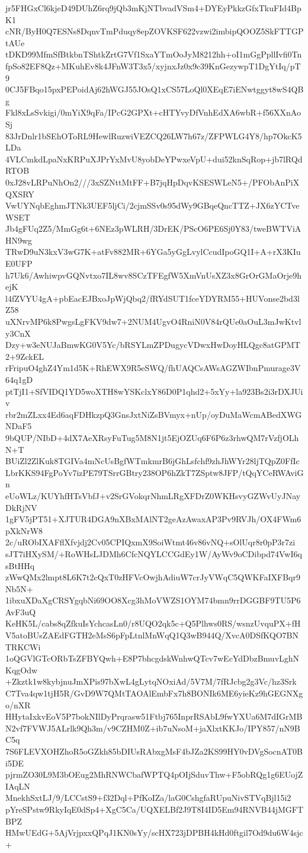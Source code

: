 jr5FHGxCl6kjeD49DUhZ6rq9jQb3mKjNTbvadVSm4+DYEyPkkzGfxTkuFId4BpK1
cNR/ByH0Q7ESNs8DqnvTmPduqy8epZOVKSF622vzwi2imbipQOOZ5SkFTTGPtAUe
tDKD99MfmSfBtkbnTShtkZrtG7Vf1SxaYTmOoJyM8212hh+oI1mGgPpllIvfi0Tn
fpSo82EF8Qz+MKuhEv8k4JFnW3T3x5/xyjnxJz0x9c39KnGezywpT1DgYtIq/pT9
0CJ5FBqo15pxPEPoidAj62hWGJ55JOsQ1xCS57LoQl0XEqE7iENwtggyt8wS4QBg
Fkl8xLsSvkigi/0mYiX9qFa/IPcG2GPXt+cHTYvyDfVnhEdXA6wbR+f56XXnAoSj
83JrDnlr1bSEhOToRL9HewlRuzwiVEZCQ26LW7h67z/ZFPWLG4Y8/hp7OkcK5LDa
4VLCmkdLpaNxKRPuXJPrYxMvU8yobDeYPwxeVpU+dui52knSqRop+jb7lRQdRTOB
0xJ28vLRPuNhOn2///3xSZNttMtFF+B7jqHpDqvKSESWLeN5+/PFObAnPiXQXSRY
VwUYNqbEghmJTNk3UEF5ljCi/2cjmSSv0s95dWy9GBqeQncTTZ+JX6zYCTveWSET
Jb4gFUq2Z5/MmGg6t+6NEz3pWLRH/3DrEK/PScO6PE6Sj0Y83/tweBWTViAHN9wg
TRwD9uN3kxV3wG7K+atFv882MR+6YGa5yGgLvylCcudIpoGQ1I+A+rX3KIuE0UFP
h7Uk6/AwhiwpvGQNvtxo7IL8wv8SCzTFEgfW5XmVnUsXZ3x8GrOrGMaOrje9hejK
l4fZVYU4gA+pbEacEJBxoJpWjQbq2/fRYdSUT1fceYDYRM55+HUVonse2bd3lZ58
uXNrvMP6k8PwgsLgFKV9dw7+2NUM4UgvO4RniN0V84rQUe0aOuL3mJwKtvly3CnX
Dzy+w3eNUJaBmwKG0V5Yc/bRSYLmZPDugycVDwxHwDoyHLQgc8atGPMT2+9ZckEL
rFripuO4ghZ4Ym1d5K+RhEWX9R5eSWQ/fhUAQCsAWsAGZWIbnPmurage3V64q1gD
ptTjI1+SfVIDQ1YD5woXTH8wYSKclxY86D0P1qhd2+5xYy+la923Bs2i3rDXJUiv
rbr2mZLxx4Ed6aqFDHkzpQ3GnsJxtNiZsBVmyx+nUp/oyDuMaWcmABedXWGNDaF5
9bQUP/NIbD+4dX7AeXRsyFuTug5M8N1jt5EjOZUq6F6P6z3rhwQM7rVzfjOLhN+T
BUiZl2ZlKuk8TGIVa4mNcUsBgfWTmkmrB6jGhLsfchf9zhJhWYr28ljTQpZ0FfIc
LbrKKS94FgPoYv7izPE79TSrrGBtry238OP6hZkT7ZSptw8JFP/tQqYCeRWAviGn
eUoWLz/KUYhfHTsVbfJ+v2SrGVokqrNhmLRgXFDrZ0WKHsvyGZWvUyJNayDkRjNV
1gFV5jPT51+XJTUR4DGA9nXBxMAlNT2geAzAwaxAP3Pv9RVJh/OX4FWm6pXkNrW8
2c/uRObIXAFflXfvjdj2Cv05CPIQxmX9SoiWtmt46v86vNQ+sOlUqr8r0pP3r7zi
sJT7iHXySM/+RoWHsLJDMh6CfcNQYLCCGdEy1W/AyWv9oCDibpd74VwI6qsBtHHq
zWwQMx2lmpt8L6K7t2cQxT0zHFVcOwjhAdiuW7crJyVWqC5QWKFaIXFBqr9Nb5N+
1ibxuXDaXgCRSYgqbNi69OO8Xcg3hMoVWZS1OYM74bmn9rrDGGBF9TU5P6AvF3uQ
KeHK5L/cabs8qZfkuIsYchcasLn0/r8UQO2qk5c+Q5Plhws0RS/wsnzUvquPX+fH
V5atoBUsZAEdFGTH2eMsS6pFpLtnlMnWqQ1Q3wB944Q/XvcA0DSfKQO7BNTRKCWi
1oQGVlGTcORbTsZFBYQwh+E8P7bhcgdskWnhwQTcv7wEcYdDbzBmuvLghNKqgOdw
+Zkztk1w8kybjnuJmXPis97bXwL4gLytqNOxiAd/5V7M/7fRJcbg2g3Vc/hz3Srk
C7Tva4qw1tjH5R/GvD9W7QMtTAOAlEmbFx7h8BONIk6ME6yieKz9hGEGNXgo/nXR
HHytaIxkvEoV5P7bokNIlDyPrqrasw51Ftbj765InprRSAbL9fwYXUa6M7dIGrMB
N2vf7FVWJ5ALrlk9Qh3m/v9CZHM0Z+ib7uNsoM+jaXlxtKKJo/IPY857/nN9BC5q
7S6FLEVXOHZhoR5oGZkh85bDIUsRAbxgMsF4bJZa2KS99HY0vDVgSocnAT0Bi5DE
pjrmZO30L9M3bOEug2MhRNWCbafWPTQ4pOIjSduvThw+F5obRQg1g6EUojZIAqLN
MnekhSxtLJ/9/LCCstS9+f32Dql+PfKoIZa/laG0CshgfaRUpuNivSTVqBjl15i2
pYreSPstw9RkyIqE0dSp4+XgC5Ca/UQXELBf2J9T8I4ID5Em94RNVB44jMGFTBPZ
HMwUEdG+5AjVrjpxxQPqJ1KN0sYy/scHX723jDPBH4kHd0ftgil7Od9du6W4sjc+
